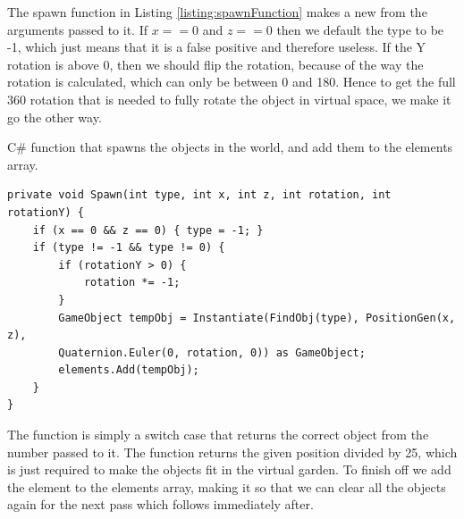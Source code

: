 The spawn function in Listing \ref{listing:spawnFunction} makes a new  from the arguments passed to it. If $x == 0$ and $z == 0$ then we default the type to be -1, which just means that it is a false positive and therefore useless. If the Y rotation is above 0, then we should flip the rotation, because of the way the rotation is calculated, which can only be between 0 and 180. Hence to get the full 360 rotation that is needed to fully rotate the object in virtual space, we make it go the other way.
\begin{listing}[H]
	\caption{C\# function that spawns the objects in the world, and add them to the elements array.}
	\begin{verbatim}
private void Spawn(int type, int x, int z, int rotation, int rotationY) {
	if (x == 0 && z == 0) { type = -1; }
	if (type != -1 && type != 0) {
		if (rotationY > 0) {
			rotation *= -1;
		}
		GameObject tempObj = Instantiate(FindObj(type), PositionGen(x, z),
		Quaternion.Euler(0, rotation, 0)) as GameObject;
		elements.Add(tempObj);
	}
}
	\end{verbatim}
\label{listing:spawnFunction}
\end{listing}
The  function is simply a switch case that returns the correct object from the number passed to it. The  function returns the given position divided by 25, which is just required to make the objects fit in the virtual garden. To finish off we add the element to the elements array, making it so that we can clear all the objects again for the next pass which follows immediately after.